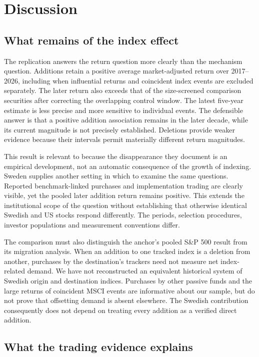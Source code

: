 \section{Discussion}\label{sec:discussion}
\subsection{What remains of the index effect}

The replication answers the return question more clearly than the mechanism question. Additions retain a positive average market-adjusted return over 2017--2026, including when influential returns and coincident index events are excluded separately. The later return also exceeds that of the size-screened comparison securities after correcting the overlapping control window. The latest five-year estimate is less precise and more sensitive to individual events. The defensible answer is that a positive addition association remains in the later decade, while its current magnitude is not precisely established. Deletions provide weaker evidence because their intervals permit materially different return magnitudes.

This result is relevant to \citet{greenwood2025} because the disappearance they document is an empirical development, not an automatic consequence of the growth of indexing. Sweden supplies another setting in which to examine the same questions. Reported benchmark-linked purchases and implementation trading are clearly visible, yet the pooled later addition return remains positive. This extends the institutional scope of the question without establishing that otherwise identical Swedish and US stocks respond differently. The periods, selection procedures, investor populations and measurement conventions differ.

The comparison must also distinguish the anchor's pooled S\&P 500 result from its migration analysis. When an addition to one tracked index is a deletion from another, purchases by the destination's trackers need not measure net index-related demand. We have not reconstructed an equivalent historical system of Swedish origin and destination indices. Purchases by other passive funds and the large returns of coincident MSCI events are informative about our sample, but do not prove that offsetting demand is absent elsewhere. The Swedish contribution consequently does not depend on treating every addition as a verified direct addition.

\subsection{What the trading evidence explains}

